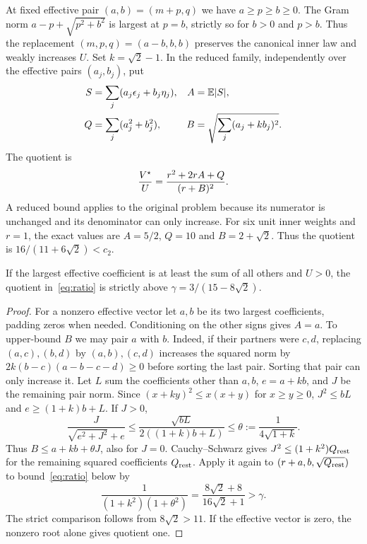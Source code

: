At fixed effective pair $(a,b)=(m+p,q)$ we have $a\ge p\ge b\ge0$.
The Gram norm $a-p+\sqrt{p^2+b^2}$ is largest at $p=b$, strictly so
for $b>0$ and $p>b$. Thus the replacement $(m,p,q)=(a-b,b,b)$
preserves the canonical inner law and weakly increases $U$. Set
$k=\sqrt2-1$. In the reduced family, independently over the effective
pairs $(a_j,b_j)$, put
\begin{align*}
 S&=\sum_j(a_j\epsilon_j+b_j\eta_j), & A&=\mathbb E|S|,\\
 Q&=\sum_j(a_j^2+b_j^2), & B&=\sqrt{\sum_j(a_j+kb_j)^2}.
\end{align*}
The quotient is
\begin{equation}
 \frac{V^\star}{U}=\frac{r^2+2rA+Q}{(r+B)^2}.
 \label{eq:ratio}
\end{equation}
A reduced bound applies to the original problem because its numerator is
unchanged and its denominator can only increase. For six unit inner
weights and $r=1$, the exact values are $A=5/2$, $Q=10$ and
$B=2+\sqrt2$. Thus the quotient is $16/(11+6\sqrt2)<c_2$.

\begin{lemma}\label{lem:dominant}
If the largest effective coefficient is at least the sum of all others
and $U>0$, the quotient in~\eqref{eq:ratio} is strictly above
$\gamma=3/(15-8\sqrt2)$.
\end{lemma}
\begin{proof}
For a nonzero effective vector let $a,b$ be its two largest coefficients,
padding zeros when needed. Conditioning on the other signs gives $A=a$.
To upper-bound $B$ we may pair $a$ with $b$. Indeed, if their partners
were $c,d$, replacing $(a,c),(b,d)$ by $(a,b),(c,d)$ increases the
squared norm by $2k(b-c)(a-b-c-d)\ge0$ before sorting the last pair.
Sorting that pair can only increase it. Let $L$ sum the coefficients
other than $a,b$, $e=a+kb$, and $J$ be the remaining pair norm. Since
$(x+ky)^2\le x(x+y)$ for $x\ge y\ge0$, $J^2\le bL$ and
$e\ge(1+k)b+L$. If $J>0$,
\[
 \frac{J}{\sqrt{e^2+J^2}+e}
 \le \frac{\sqrt{bL}}{2((1+k)b+L)}
 \le \theta:=\frac1{4\sqrt{1+k}} .
\]
Thus $B\le a+kb+\theta J$, also for $J=0$.
Cauchy--Schwarz gives $J^2\le(1+k^2)Q_{\rm rest}$ for the remaining
squared coefficients $Q_{\rm rest}$. Apply it again to
$(r+a,b,\sqrt{Q_{\rm rest}})$ to bound~\eqref{eq:ratio} below by
\[
 \frac1{(1+k^2)(1+\theta^2)}
 =\frac{8\sqrt2+8}{16\sqrt2+1}>\gamma .
\]
The strict comparison follows from $8\sqrt2>11$. If the effective vector
is zero, the nonzero root alone gives quotient one.
\end{proof}

